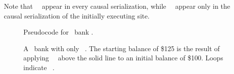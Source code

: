 Note that \shadow\ \operations\ appear in every
  causal serialization, while \initial\ \operations\ appear only in
  the causal serialization of the initially executing site.
  
 \begin{figure}[!t]
\centering
\begin{minipage}{0.5\columnwidth}
\end{minipage}
\caption{Pseudocode for \shadow\ bank \operations.}
\label{fig:bankshadowcode}
\end{figure}

\begin{figure}[t]
\centering
\begin{minipage}[t]{0.6\columnwidth}
\centering
{}
\end{minipage}
\par\bigskip
\begin{minipage}[t]{0.75\columnwidth}
\centering
{}
\end{minipage}
\caption{ A \RBct\ bank with only \blue\ \operations.
  The starting balance of \$125 is the result of applying
  \shadow\ \operations\ above the solid line to an initial balance of
  \$100.  Loops indicate \initial\ \operations.}
\label{fig:shadowopfigure}
\end{figure}

